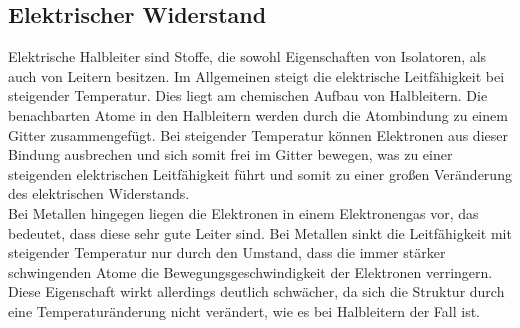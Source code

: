 \subsection{Elektrischer Widerstand}
Elektrische Halbleiter sind Stoffe, die sowohl Eigenschaften von Isolatoren, als auch von Leitern besitzen. Im Allgemeinen steigt die elektrische Leitfähigkeit bei steigender Temperatur. Dies liegt am chemischen Aufbau von Halbleitern. Die benachbarten Atome in den Halbleitern werden durch die Atombindung zu einem Gitter zusammengefügt. Bei steigender Temperatur können Elektronen aus dieser Bindung ausbrechen und sich somit frei im Gitter bewegen, was zu einer steigenden elektrischen Leitfähigkeit führt und somit zu einer großen Veränderung des elektrischen Widerstands.\\
Bei Metallen hingegen liegen die Elektronen in einem Elektronengas vor, das bedeutet, dass diese sehr gute Leiter sind. Bei Metallen sinkt die Leitfähigkeit mit steigender Temperatur nur durch den Umstand, dass die immer stärker schwingenden Atome die Bewegungsgeschwindigkeit der Elektronen verringern. Diese Eigenschaft wirkt allerdings deutlich schwächer, da sich die Struktur durch eine Temperaturänderung nicht verändert, wie es bei Halbleitern der Fall ist.









